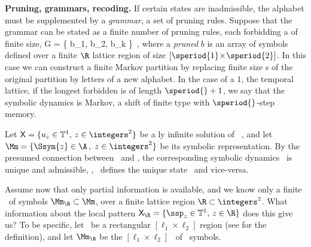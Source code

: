 {\bf Pruning, grammars, recoding.}
If certain states are inadmissible, the alphabet must be supplemented by a
{\em grammar},
a set of pruning rules.
Suppose that
the grammar can be stated as a finite number of pruning rules, each
forbidding a {\brick} of finite size,
\beq
 {\cal G} = \left\{
        b_1, b_2, \cdots b_k
        \right\}
\,,
where a {\em pruned {\brick}} $b$ is an array of symbols defined over a
finite $\R$ lattice region of size $[ \speriod{1}\!\times\!\speriod{2}]$. In
this case we can construct a finite Markov partition by replacing finite
size \brick s of the original partition by letters of a new alphabet. In
the case of a 1\dmn, the temporal lattice, if the longest forbidden {\brick}
is of length $\speriod{}+1$, we say that the symbolic dynamics is Markov, a shift
of finite type with {$\speriod{}$-step memory}.

Let
\(
\Xx=\{u_{z} \in  \mathbb{T}^{1},\, z\in \integers^2\}
\)
be a {\spt}ly infinite  solution of \KSe\ ,
and let
\(
\Mm= \{\Ssym{z} \in \A \,,\; z\in \integers^2 \}
\)
be its symbolic representation. By the presumed connection between \Xx\ and
\Mm, the corresponding symbolic dynamics {\brick} \Mm\ is unique and
admissible, \ie, \Mm\ defines the unique {\spt} state \Xx\ and
vice-versa.

Assume now that only partial information is available, and we know
only a finite \brick\ of symbols $\Mm_{\R}\subset\Mm$,
over a finite lattice region $\R\subset \integers^2$. What information
about the local {\spt} pattern
\(
\Xx_{\R}=\{\ssp_{z} \in  \mathbb{T}^{1},\, z\in\R\}
\)
does this give us?
To be specific, let \R\  be a   rectangular $[\ell_1\!\times\!\ell_2]$
region (see  for the definition),
and let
\(
\Mm_{\R} %
\)
be the  $[\ell_1\!\times\!\ell_2]$
\brick\ of \Mm\ symbols.


